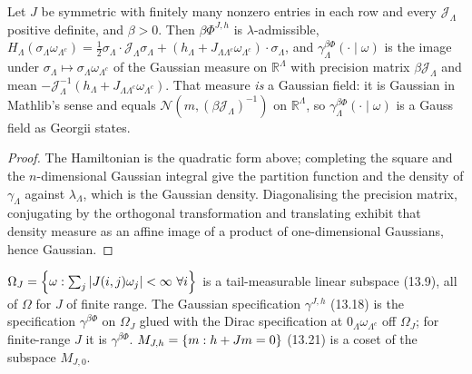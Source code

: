 \begin{theorem}[Georgii (13.13)]
    \label{thm:gf-13-13}
    \leanok

    Let $J$ be symmetric with finitely many nonzero entries in each row and every
    $\mathcal J_\Lambda$ positive definite, and $\beta > 0$. Then $\beta\Phi^{J,h}$ is
    $\lambda$-admissible, $H_\Lambda(\sigma_\Lambda\omega_{\Lambda^c}) = \tfrac12 \sigma_\Lambda \cdot \mathcal J_\Lambda\sigma_\Lambda + (h_\Lambda + J_{\Lambda\Lambda^c}\omega_{\Lambda^c})\cdot\sigma_\Lambda$,
    and $\gamma^{\beta\Phi}_\Lambda(\cdot \mid \omega)$ is the image under
    $\sigma_\Lambda \mapsto \sigma_\Lambda\omega_{\Lambda^c}$ of the Gaussian measure on
    $\mathbb R^\Lambda$ with precision matrix $\beta\mathcal J_\Lambda$ and mean
    $-\mathcal J_\Lambda^{-1}(h_\Lambda + J_{\Lambda\Lambda^c}\omega_{\Lambda^c})$. That measure
    \emph{is} a Gaussian field: it is Gaussian in Mathlib's sense and equals
    $\mathcal N(m, (\beta\mathcal J_\Lambda)^{-1})$ on $\mathbb R^\Lambda$, so
    $\gamma^{\beta\Phi}_\Lambda(\cdot\mid\omega)$ is a Gauss field as Georgii states.
\end{theorem}
\begin{proof}
    \leanok
    The Hamiltonian is the quadratic form above; completing the square and the
    $n$-dimensional Gaussian integral give the partition function and the density of
    $\gamma_\Lambda$ against $\lambda_\Lambda$, which is the Gaussian density. Diagonalising the
    precision matrix, conjugating by the orthogonal transformation and translating exhibit that
    density measure as an affine image of a product of one-dimensional Gaussians, hence Gaussian.
\end{proof}

\begin{definition}[Georgii (13.9), (13.18), (13.21)]
    \label{def:gf-13-18}
    \leanok

    $\Omega_J = \left\{ \omega : \sum_j |J(i,j)\omega_j| < \infty \ \forall i \right\}$ is a tail-measurable
    linear subspace (13.9), all of $\Omega$ for $J$ of finite range. The Gaussian specification
    $\gamma^{J,h}$ (13.18) is the specification $\gamma^{\beta\Phi}$ on $\Omega_J$ glued with the
    Dirac specification at $0_\Lambda\omega_{\Lambda^c}$ off $\Omega_J$; for finite-range $J$ it is
    $\gamma^{\beta\Phi}$. $M_{J,h} = \left\{ m : h + Jm = 0 \right\}$ (13.21) is a coset of the subspace $M_{J,0}$.
\end{definition}
